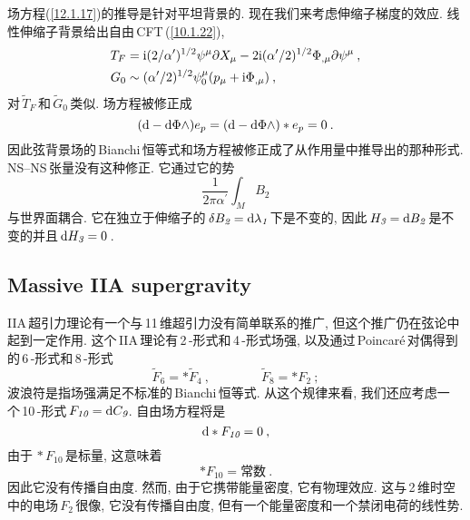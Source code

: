 场方程(\ref{12.1.17})的推导是针对平坦背景的. 现在我们来考虑伸缩子梯度的效应. 线性伸缩子背景给出自由\,CFT\,(\ref{10.1.22}),
\begin{subequations}
    \begin{align}
        T_{F}&=\mathrm{i}(2/\alpha^{\prime})^{1/2}\psi^{\mu}\partial X_{\mu}-2\mathrm{i}(\alpha^{\prime}/2)^{1/2}\Phi_{,\mu}\partial\psi^{\mu} \:, \label{12.1.18a} \\
        G_{0}&\sim (\alpha^{\prime}/2)^{1/2}\psi_{0}^{\mu}(p_{\mu}+\mathrm{i}\Phi_{,\mu}) \:, \label{12.1.18b}
    \end{align} \label{12.1.18}
\end{subequations}
对$\,\tilde{T}_{F}\,$和$\,\tilde{G}_{0}\,$类似. 场方程被修正成
\begin{equation}
    (\mathrm{d}-\mathrm{d}\Phi\wedge) e_{p}=(\mathrm{d}-\mathrm{d}\Phi\wedge)\ast e_{p} =0\:. \label{12.1.19}
\end{equation}
因此弦背景场的\,Bianchi\,恒等式和场方程被修正成了从作用量中推导出的那种形式. NS--NS\,张量没有这种修正. 它通过它的势
\begin{equation}
    \frac{1}{2\pi\alpha^{\prime}} \int_{M}B_{\textit{2}} \label{12.1.20}
\end{equation}
与世界面耦合. 它在独立于伸缩子的$\,\delta B_{\textit{2}}=\mathrm{d}\lambda_{\textit{1}}\,$下是不变的, 因此\,$H_{\textit{3}}=\mathrm{d} B_{\textit{2}}\,$是不变的并且$\,\mathrm{d} H_{\textit{3}}=0$\,.

\subsection*{Massive IIA supergravity}

IIA\,超引力理论有一个与\,11\,维超引力没有简单联系的推广, 但这个推广仍在弦论中起到一定作用. 这个\,IIA\,理论有\,2\,-形式和\,4\,-形式场强, 以及通过\,Poincar\'{e}\,对偶得到的\,6\,-形式和\,8\,-形式
\begin{equation}
    \tilde{F}_{\textit{6}}=\ast\tilde{F}_{\textit{4}}\:,\qquad \qquad 
    \tilde{F}_{\textit{8}}=\ast F_{\textit{2}}\:; \label{12.1.21}
\end{equation}
波浪符是指场强满足不标准的\,Bianchi\,恒等式. 从这个规律来看, 我们还应考虑一个\,10\,-形式$\,F_{\textit{10}}=\mathrm{d} C_{\textit{9}}$. 自由场方程将是
\begin{equation}
    \mathrm{d} \ast F_{\textit{10}} =0 \:, \label{12.1.22}
\end{equation}
由于$\,\ast F_{\textit{10}}\,$是标量, 这意味着
\begin{equation}
    \ast F_{\textit{10}} = \text{常数}\:. \label{12.1.23}
\end{equation}
因此它没有传播自由度. 然而, 由于它携带能量密度, 它有物理效应. 这与\,2\,维时空中的电场$\,F_{\textit{2}}$\,很像, 它没有传播自由度, 但有一个能量密度和一个禁闭电荷的线性势.

